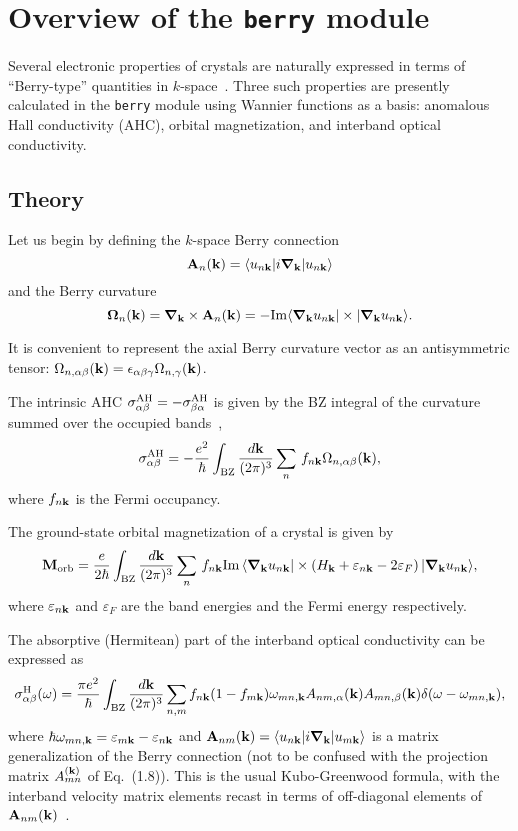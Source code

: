 \chapter{ Overview of the {\tt berry} module}
\label{ch:berry}

Several electronic properties of crystals are naturally expressed in
terms of ``Berry-type'' quantities in $k$-space~\cite{xiao-rmp10}.
Three such properties are presently calculated in the {\tt berry}
module using Wannier functions as a basis: anomalous Hall conductivity
(AHC), orbital magnetization, and interband optical conductivity.

\section{Theory}

Let us begin by defining the $k$-space Berry connection
%
$$
{\bf A}_n({\bf k})=\langle u_{n{\bf k}}\vert i\bm{\nabla}_{\bf k}\vert
u_{n{\bf k}}\rangle
$$
%
and the Berry curvature
%
$$
\bm{\Omega}_n({\bf k})=\bm{\nabla}_{\bf k}\times {\bf A}_n({\bf k})=
-{\rm Im}
\langle \bm{\nabla}_{\bf k} u_{n{\bf k}}\vert \times
\vert\bm{\nabla}_{\bf k} u_{n{\bf k}}\rangle.
$$

It is convenient to represent the axial Berry curvature
vector as an antisymmetric tensor: $ \Omega_{n,\alpha\beta}({\bf k})
=\epsilon_{\alpha\beta\gamma} \Omega_{n,\gamma}({\bf k})$.

The
intrinsic AHC $\sigma^{\rm AH}_{\alpha\beta}=-\sigma^{\rm
  AH}_{\beta\alpha}$ is given by the BZ integral of the curvature
summed over the occupied bands~\cite{xiao-rmp10},
%
$$
\sigma^{\rm AH}_{\alpha\beta}=-\frac{e^2}{\hbar}
\int_{\rm BZ}\frac{d{\bf k}}{(2\pi)^3}\sum_n\,f_{n{\bf
    k}}\Omega_{n,\alpha\beta}({\bf k}),
$$
%
where $f_{n{\bf k}}$ is the Fermi occupancy.

The ground-state orbital magnetization of a crystal is given
by~\cite{xiao-rmp10,ceresoli-prb06}
%
$$
{\bf M}_{\rm orb}=\frac{e}{2\hbar}\int_{\rm BZ}\frac{d{\bf
    k}}{(2\pi)^3}\sum_n\,f_{n{\bf k}}
{\rm Im}\,\langle \bm{\nabla}_{\bf k}u_{n{\bf k}}\vert
\times
\left(H_{\bf k}+\varepsilon_{n{\bf k}}-2\varepsilon_F\right)
\vert \bm{\nabla}_{\bf k}u_{n{\bf k}}\rangle,
$$
%
where $\varepsilon_{n{\bf k}}$ and $\varepsilon_F$ are
the band energies and the Fermi energy respectively.

The absorptive (Hermitean) part of the interband optical conductivity
can be expressed as
%
$$
\sigma^{\rm H}_{\alpha\beta}(\omega)=\frac{\pi e^2}{\hbar}
\int_{\rm BZ}\frac{d{\bf
    k}}{(2\pi)^3}\sum_{n,m}f_{n{\bf k}}(1-f_{m{\bf k}})\omega_{mn,\bf k}
A_{nm,\alpha}({\bf k})A_{mn,\beta}({\bf k})
\delta(\omega-\omega_{mn,\bf k}),
$$
%
where $\hbar\omega_{mn,\bf k}=\varepsilon_{m{\bf
    k}}-\varepsilon_{n{\bf k}}$ and $ {\bf A}_{nm}({\bf k})=\langle
u_{n{\bf k}}\vert i\bm{\nabla}_{\bf k}\vert u_{m{\bf k}}\rangle$ is a
matrix generalization of the Berry connection (not to be confused with
the projection matrix $A^{({\bf k})}_{mn}$ of Eq.~(1.8)).  This is the
usual Kubo-Greenwood formula, with the interband velocity matrix
elements recast in terms of off-diagonal elements of ${\bf
  A}_{nm}({\bf k})$~\cite{blount}.

